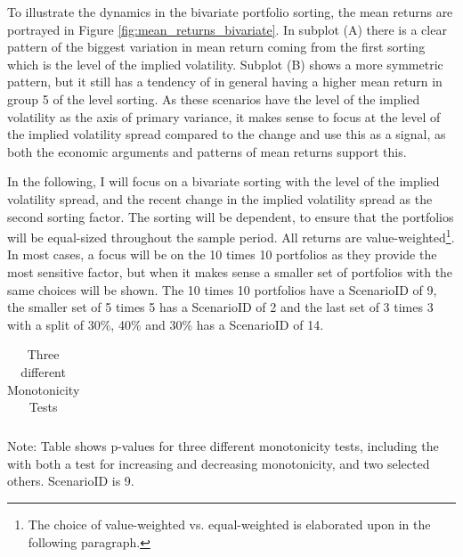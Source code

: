 To illustrate the dynamics in the bivariate portfolio sorting, the mean returns are portrayed in Figure \ref{fig:mean_returns_bivariate}. In subplot (A) there is a clear pattern of the biggest variation in mean return coming from the first sorting which is the level of the implied volatility. Subplot (B) shows a more symmetric pattern, but it still has a tendency of in general having a higher mean return in group 5 of the level sorting. As these scenarios have the level of the implied volatility as the axis of primary variance, it makes sense to focus at the level of the implied volatility spread compared to the change and use this as a signal, as both the economic arguments and patterns of mean returns support this. 

In the following, I will focus on a bivariate sorting with the level of the implied volatility spread, and the recent change in the implied volatility spread as the second sorting factor. The sorting will be dependent, to ensure that the portfolios will be equal-sized throughout the sample period. All returns are value-weighted\footnote{The choice of value-weighted vs. equal-weighted is elaborated upon in the following paragraph.}. In most cases, a focus will be on the 10 times 10 portfolios as they provide the most sensitive factor, but when it makes sense a smaller set of portfolios with the same choices will be shown. The 10 times 10 portfolios have a ScenarioID of 9, the smaller set of 5 times 5 has a ScenarioID of 2 and the last set of 3 times 3 with a split of 30\%, 40\% and 30\% has a ScenarioID of 14. 

\begin{table}[ht]
	\centering
	
	\caption[Monotonicity Tests]{Three different Monotonicity Tests}
	\label{tab:monotonicity_tests_9}
	
	\begin{tabular}{l|rrrr}
		
	\end{tabular}
	
	{\small Note: Table shows p-values for three different monotonicity tests, including the \cite{patton2010monotonicity} with both a test for increasing and decreasing monotonicity, and two selected others. ScenarioID is 9.}
	
\end{table}

